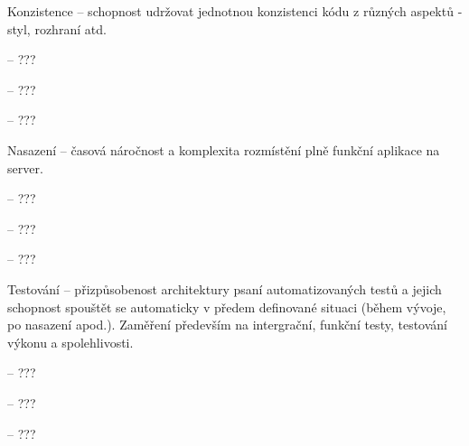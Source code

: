 \begin{dl}
   \item[Konzistence] – schopnost udržovat jednotnou konzistenci kódu z různých aspektů - styl, rozhraní atd.
\end{dl}
\begin{ul}
   \item {} – ???
   \item {} – ???
   \item {} – ???
\end{ul}

\begin{dl}
   \item[Nasazení] – časová náročnost a komplexita rozmístění plně funkční aplikace na server.
\end{dl}
\begin{ul}
   \item {} – ???
   \item {} – ???
   \item {} – ???
\end{ul}

\begin{dl}
   \item[Testování] – přizpůsobenost architektury psaní automatizovaných testů a jejich schopnost spouštět se automaticky v předem definované situaci (během vývoje, po nasazení apod.).
   Zaměření především na intergrační, funkční testy, testování výkonu a spolehlivosti.
\end{dl}
\begin{ul}
   \item {} – ???
   \item {} – ???
   \item {} – ???
\end{ul}
